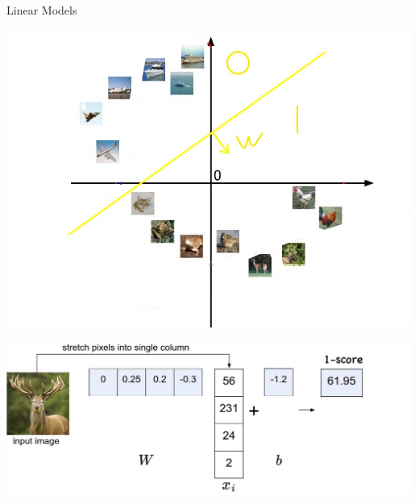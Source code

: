 \documentclass{beamer}
\begin{document}
\begin{frame}{Linear Models}
		 \begin{center}
		 	  \includegraphics[scale=0.27]{img/pclf1}
		 	 
			   \includegraphics[scale=0.15]{img/clf1}
		 \end{center}
\end{frame}
\end{document}
